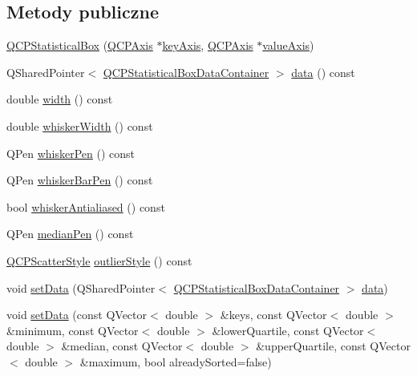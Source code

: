 \subsection*{Metody publiczne}
\begin{DoxyCompactItemize}
\item 
\hyperlink{class_q_c_p_statistical_box_a75c2b3e7fcd0741cc981693a2ba63b27}{Q\+C\+P\+Statistical\+Box} (\hyperlink{class_q_c_p_axis}{Q\+C\+P\+Axis} $\ast$\hyperlink{class_q_c_p_abstract_plottable_a72c7a09c22963f2c943f07112b311103}{key\+Axis}, \hyperlink{class_q_c_p_axis}{Q\+C\+P\+Axis} $\ast$\hyperlink{class_q_c_p_abstract_plottable_a3106f9d34d330a6097a8ec5905e5b519}{value\+Axis})
\item 
Q\+Shared\+Pointer$<$ \hyperlink{qcustomplot_8hh_a8b773c0c35f8f924701ced6e9915e4c7}{Q\+C\+P\+Statistical\+Box\+Data\+Container} $>$ \hyperlink{class_q_c_p_statistical_box_a99de828ddad81bb79aaed7db54b87e3f}{data} () const 
\item 
double \hyperlink{class_q_c_p_statistical_box_a0733a7bd575fc5929ce6d507bcc2a04c}{width} () const 
\item 
double \hyperlink{class_q_c_p_statistical_box_ab02392dd54ebd6dd7c8d6fb5c3f0421c}{whisker\+Width} () const 
\item 
Q\+Pen \hyperlink{class_q_c_p_statistical_box_a26d2b34cbaeac2dd639bb21590f317c4}{whisker\+Pen} () const 
\item 
Q\+Pen \hyperlink{class_q_c_p_statistical_box_ab151a727fb0b6396acb3b6c72505a4fe}{whisker\+Bar\+Pen} () const 
\item 
bool \hyperlink{class_q_c_p_statistical_box_a1385fb66ed6a1e8edd9128eb7dca73d6}{whisker\+Antialiased} () const 
\item 
Q\+Pen \hyperlink{class_q_c_p_statistical_box_a96aa0bb650b83e9dfa0387ca4db7fa05}{median\+Pen} () const 
\item 
\hyperlink{class_q_c_p_scatter_style}{Q\+C\+P\+Scatter\+Style} \hyperlink{class_q_c_p_statistical_box_ab7e5a68bce97ba43a7ff18e074c4dcad}{outlier\+Style} () const 
\item 
void \hyperlink{class_q_c_p_statistical_box_a08a6da55822bad825ee25a8069b9b52f}{set\+Data} (Q\+Shared\+Pointer$<$ \hyperlink{qcustomplot_8hh_a8b773c0c35f8f924701ced6e9915e4c7}{Q\+C\+P\+Statistical\+Box\+Data\+Container} $>$ \hyperlink{class_q_c_p_statistical_box_a99de828ddad81bb79aaed7db54b87e3f}{data})
\item 
void \hyperlink{class_q_c_p_statistical_box_a4ae198e66243d8cc57ad8893c37bf9d4}{set\+Data} (const Q\+Vector$<$ double $>$ \&keys, const Q\+Vector$<$ double $>$ \&minimum, const Q\+Vector$<$ double $>$ \&lower\+Quartile, const Q\+Vector$<$ double $>$ \&median, const Q\+Vector$<$ double $>$ \&upper\+Quartile, const Q\+Vector$<$ double $>$ \&maximum, bool already\+Sorted=false)

\end{DoxyCompactItemize}
